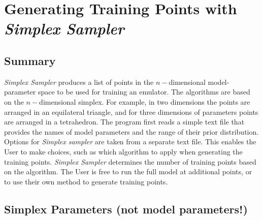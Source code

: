 \documentclass[UserManual.tex]{subfiles}
\begin{document}
\setcounter{section}{2}

\section{Generating Training Points with {\it Simplex Sampler}}\label{sec:simplex}

\subsection{Summary}
{\it Simplex Sampler} produces a list of points in the $n-$dimensional model-parameter space to be used for training an emulator. The algorithms are based on the $n-$dimensional simplex. For example, in two dimensions the points are arranged in an equilateral triangle, and for three dimensions of parameters points are arranged in a tetrahedron. The program first reads a simple text file that provides the names of model parameters and the range of their prior distribution. Options for {\it Simplex sampler} are taken from a separate text file. This enables the User to make choices, such as which algorithm to apply when generating the training points. {\it Simplex Sampler} determines the number of training points based on the algorithm. The User is free to run the full model at additional points, or to use their own method to generate training points.

\subsection{Simplex Parameters (not model parameters!)}
\end{document}
